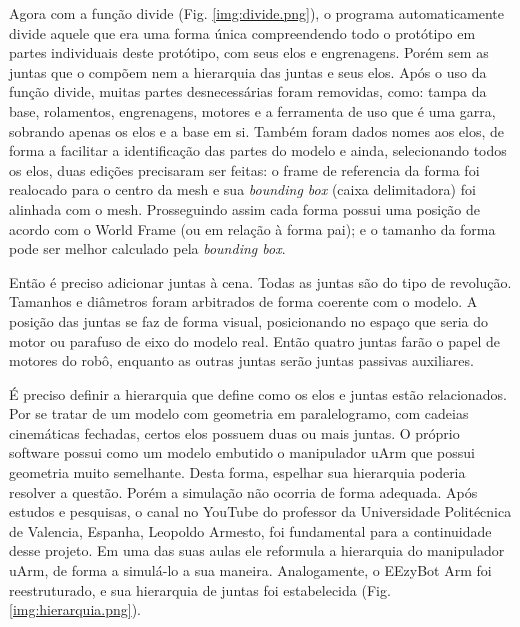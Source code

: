 
Agora com a função divide (Fig. \ref{img:divide.png}), o programa automaticamente divide aquele que era uma forma única compreendendo todo o protótipo em partes individuais deste protótipo, com seus elos e engrenagens. Porém sem as juntas que o compõem nem a hierarquia das juntas e seus elos. Após o uso da função divide, muitas partes desnecessárias foram removidas, como: tampa da base, rolamentos, engrenagens, motores e a ferramenta de uso que é uma garra, sobrando apenas os elos e a base em si. Também foram dados nomes aos elos, de forma a facilitar a identificação das partes do modelo e ainda, selecionando todos os elos, duas edições precisaram ser feitas: o frame de referencia da forma foi realocado para o centro da mesh e sua \textit{bounding box} (caixa delimitadora) foi alinhada com o mesh. Prosseguindo assim cada forma possui uma posição de acordo com o World Frame (ou em relação à forma pai); e o tamanho da forma pode ser melhor calculado pela \textit{bounding box}.


Então é preciso adicionar juntas à cena. Todas as juntas são do tipo de revolução. Tamanhos e diâmetros foram arbitrados de forma coerente com o modelo. A posição das juntas se faz de forma visual, posicionando no espaço que seria do motor ou parafuso de eixo do modelo real. Então quatro juntas farão o papel de motores do robô, enquanto as outras juntas serão juntas passivas auxiliares.

É preciso definir a hierarquia que define como os elos e juntas estão relacionados. Por se tratar de um modelo com geometria em paralelogramo, com cadeias cinemáticas fechadas, certos elos possuem duas ou mais juntas. O próprio software possui como um modelo embutido o manipulador uArm que possui geometria muito semelhante. Desta forma, espelhar sua hierarquia poderia resolver a questão. Porém a simulação não ocorria de forma adequada. Após estudos e pesquisas, o canal no YouTube do professor da Universidade Politécnica de Valencia, Espanha, Leopoldo Armesto, foi fundamental para a continuidade desse projeto. Em uma das suas aulas ele reformula a hierarquia do manipulador uArm, de forma a simulá-lo a sua maneira. Analogamente, o EEzyBot Arm foi reestruturado, e sua hierarquia de juntas foi estabelecida (Fig. \ref{img:hierarquia.png}).

